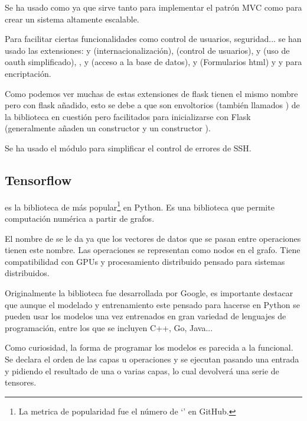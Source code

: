 Se ha usado  como  ya que sirve tanto para implementar el patrón MVC como para crear un sistema altamente escalable. 

Para facilitar ciertas funcionalidades como control de usuarios, seguridad... se han usado las extensiones:  y  (internacionalización),  (control de usuarios),  y  (uso de oauth simplificado), ,  y  (acceso a la base de datos),  y  (Formularios html) y  y  para encriptación.

Como podemos ver muchas de estas extensiones de flask tienen el mismo nombre pero con flask añadido, esto se debe a que son envoltorios (también llamados ) de la biblioteca en cuestión pero facilitados para inicializarse con Flask (generalmente añaden un constructor y un constructor ).

Se ha usado el módulo  para simplificar el control de errores de SSH.

\subsection{Tensorflow}
 es la biblioteca de  más popular\footnote{La metrica de popularidad fue el número de `' en GitHub.} en Python. Es una biblioteca  que permite computación numérica a partir de grafos.

El nombre de  se le da ya que los vectores de datos que se pasan entre operaciones tienen este nombre. Las operaciones se representan como nodos en el grafo. Tiene compatibilidad con GPUs y procesamiento distribuido pensado para sistemas distribuidos. 

Originalmente la biblioteca fue desarrollada por Google, es importante destacar que aunque el modelado y entrenamiento este pensado para hacerse en Python se pueden usar los modelos una vez entrenados en gran variedad de lenguajes de programación, entre los que se incluyen C++, Go, Java... 

Como curiosidad, la forma de programar los modelos es parecida a la funcional. Se declara el orden de las capas u operaciones y se ejecutan pasando una entrada y pidiendo el resultado de una o varias capas, lo cual devolverá una serie de tensores. 




 

